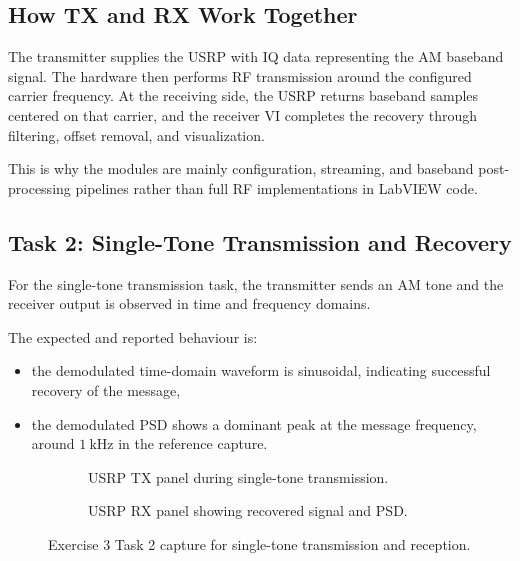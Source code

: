 \subsection{How TX and RX Work Together}

The transmitter supplies the USRP with IQ data representing the AM baseband
signal. The hardware then performs RF transmission around the configured carrier
frequency. At the receiving side, the USRP returns baseband samples centered on
that carrier, and the receiver VI completes the recovery through filtering,
offset removal, and visualization.

This is why the modules are mainly configuration, streaming, and baseband
post-processing pipelines rather than full RF implementations in LabVIEW code.

\subsection{Task 2: Single-Tone Transmission and Recovery}

For the single-tone transmission task, the transmitter sends an AM tone and the
receiver output is observed in time and frequency domains.

The expected and reported behaviour is:
\begin{itemize}
\item the demodulated time-domain waveform is sinusoidal, indicating successful
recovery of the message,
\item the demodulated PSD shows a dominant peak at the message frequency, around
$1~\text{kHz}$ in the reference capture.
\end{itemize}

\begin{figure}[H]
\centering
\begin{subfigure}{0.49\linewidth}
\centering
{}
\caption{USRP TX panel during single-tone transmission.}
\label{fig:lab2_ex3_task2_tx}
\end{subfigure}
\hfill
\begin{subfigure}{0.49\linewidth}
\centering
{}
\caption{USRP RX panel showing recovered signal and PSD.}
\label{fig:lab2_ex3_task2_rx}
\end{subfigure}
\caption{Exercise 3 Task 2 capture for single-tone transmission and reception.}
\label{fig:lab2_ex3_task2}
\end{figure}

